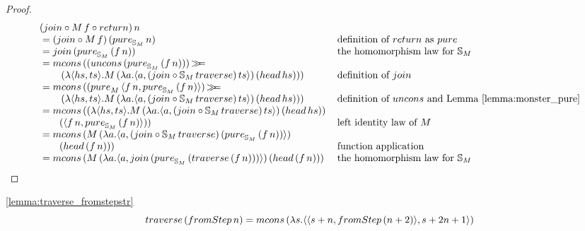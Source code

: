 \begin{proof}

$$
\begin{array}{ll}
(\join \comp  M\, f \comp \return)\, n \\
{}= (\join \comp  M\, f)\, (\apure_{\stream{M}}\, n)
  & \mbox{definition of } \return \mbox{ as } \apure \\
{}= \join\, (\apure_{\stream{M}}\, (f \,n))
  & \mbox{the homomorphism law for } \stream{M}\\
{}= \mcons\, ((\uncons\, (\apure_{\stream{M}}\, (f\, n)))\, \bind \\\qquad \,(\lambda \pair{hs}{ts} . M\,(\lambda a . \pair{a}{(\join \comp \stream{M}\,\mathsf{traverse})\, ts})\, (\head\, hs)))
  & \mbox{definition of } \join \\
{}= \mcons\,((\apure_{M}\,\pair{f\, n}{\apure_{\stream{M}}\,(f\, n)})\, \bind \\\qquad \,(\lambda \pair{hs}{ts} . M\,(\lambda a . \pair{a}{(\join \comp \stream{M}\, \mathsf{traverse})\, ts})\, (\head\, hs)))
  & \mbox{definition of } \uncons \mbox{ and Lemma \ref{lemma:monster_pure}}\\
{}= \mcons\, ((\lambda \pair{hs}{ts} . M\,(\lambda a . \pair{a}{(\join \comp \stream{M}\,\mathsf{traverse})\, ts})\, (\head\, hs)) \, \\\qquad (\pair{f\, n}{\apure_{\stream{M}}\,(f\, n)}))
  & \mbox{left identity law of } M \\
{}= \mcons\,(M\,(\lambda a . \pair{a}{(\join \comp \stream{M}\,\mathsf{traverse})\, (\apure_{\stream{M}}\,(f\, n))})\, \\ \qquad (\head\, (f\, n)))
 & \mbox{function application} \\
 {}= \mcons\, (M\,(\lambda a . \pair{a}{\join\, (\apure_{\stream{M}}\, (\mathsf{traverse}\, (f\, n)))})\, (\head\, (f\, n)))
 & \mbox{the homomorphism law for } \stream{M}\\

\end{array} 
$$
\end{proof}


\begin{lemmaa}{\ref{lemma:traverse_fromstepstr}}
$$
\mathsf{traverse}\, (\fromstepstr\, n) = \mcons\, (\lambda s . \pair{\pair{s+n}{\fromstepstr\, (n + 2)}}{s + 2n + 1})
$$
\end{lemmaa} 

